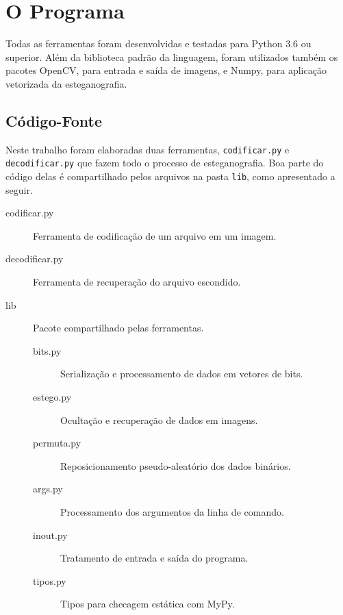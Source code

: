 \section{O Programa} \label{sec:programa}

Todas as ferramentas foram desenvolvidas e testadas para Python 3.6 ou superior. Além da biblioteca padrão da linguagem, foram utilizados também os pacotes OpenCV, para entrada e saída de imagens, e Numpy, para aplicação vetorizada da esteganografia.

\subsection{Código-Fonte}

    Neste trabalho foram elaboradas duas ferramentas, \texttt{codificar.py} e \texttt{decodificar.py} que fazem todo o processo de esteganografia. Boa parte do código delas é compartilhado pelos arquivos na pasta \texttt{lib}, como apresentado a seguir.

    \begin{description}
        \item[codificar.py] Ferramenta de codificação de um arquivo em um imagem.

        \item[decodificar.py] Ferramenta de recuperação do arquivo escondido.

        \item[lib] Pacote compartilhado pelas ferramentas.

        \begin{description}
            \item[bits.py] Serialização e processamento de dados em vetores de bits.

            \item[estego.py] Ocultação e recuperação de dados em imagens.

            \item[permuta.py] Reposicionamento pseudo-aleatório dos dados binários.

            \item[args.py] Processamento dos argumentos da linha de comando.

            \item[inout.py] Tratamento de entrada e saída do programa.

            \item[tipos.py] Tipos para checagem estática com MyPy.
        \end{description}
    \end{description}

